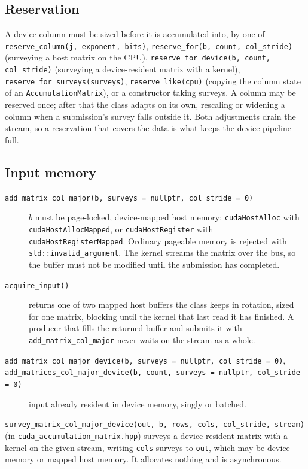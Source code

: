 \documentclass[11pt]{article}
\newcommand{\code}[1]{\texttt{#1}}
\begin{document}
\subsection{Reservation}
A device column must be sized before it is accumulated into, by one of \code{reserve\_column(j, exponent, bits)}, \code{reserve\_for(b, count, col\_stride)} (surveying a host matrix on the CPU), \code{reserve\_for\_device(b, count, col\_stride)} (surveying a device-resident matrix with a kernel), \code{reserve\_for\_surveys(surveys)}, \code{reserve\_like(cpu)} (copying the column state of an \code{AccumulationMatrix}), or a constructor taking surveys. A column may be reserved once; after that the class adapts on its own, rescaling or widening a column when a submission's survey falls outside it. Both adjustments drain the stream, so a reservation that covers the data is what keeps the device pipeline full.

\subsection{Input memory}
\begin{description}
\item[\code{add\_matrix\_col\_major(b, surveys = nullptr, col\_stride = 0)}] $b$ must be page-locked, device-mapped host memory: \code{cudaHostAlloc} with \code{cudaHostAllocMapped}, or \code{cudaHostRegister} with \code{cudaHostRegisterMapped}. Ordinary pageable memory is rejected with \code{std::invalid\_argument}. The kernel streams the matrix over the bus, so the buffer must not be modified until the submission has completed.
\item[\code{acquire\_input()}] returns one of two mapped host buffers the class keeps in rotation, sized for one matrix, blocking until the kernel that last read it has finished. A producer that fills the returned buffer and submits it with \code{add\_matrix\_col\_major} never waits on the stream as a whole.
\item[\code{add\_matrix\_col\_major\_device(b, surveys = nullptr, col\_stride = 0)}, \code{add\_matrices\_col\_major\_device(b, count, surveys = nullptr, col\_stride = 0)}] input already resident in device memory, singly or batched.
\end{description}
\code{survey\_matrix\_col\_major\_device(out, b, rows, cols, col\_stride, stream)} (in \code{cuda\_accumulation\_matrix.hpp}) surveys a device-resident matrix with a kernel on the given stream, writing \code{cols} surveys to \code{out}, which may be device memory or mapped host memory. It allocates nothing and is asynchronous.
\end{document}
